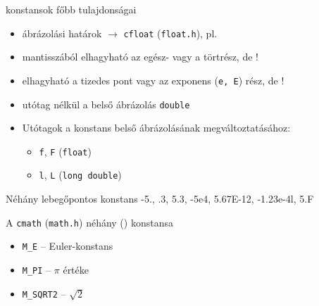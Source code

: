 \documentclass[usenames,dvipsnames,aspectratio=169]{beamer}
\begin{document}
\begin{frame}
  \begin{exampleblock}{}
  \footnotesize
  
\end{exampleblock}
\end{frame}

\begin{frame}
   konstansok főbb tulajdonságai
  \begin{itemize}
    \item ábrázolási határok $\to$ \texttt{cfloat} (\texttt{float.h}), pl. 
    \item mantisszából elhagyható az egész- vagy a törtrész, de !
    \item elhagyható a tizedes pont vagy az exponens (\texttt{e, E}) rész, de !
    \item utótag nélkül a belső ábrázolás \texttt{double}
  \end{itemize}
\end{frame}

\begin{frame}
  \begin{itemize}
    \item Utótagok a konstans belső ábrázolásának megváltoztatásához:
    \begin{itemize}
      \item \texttt{f}, \texttt{F} (\texttt{float})
      \item \texttt{l}, \texttt{L} (\texttt{long double})
    \end{itemize}
  \end{itemize}
  \begin{exampleblock}{Néhány lebegőpontos konstans}
    -5., .3, 5.3, -5e4, 5.67E-12, -1.23e-4l, 5.F
  \end{exampleblock}
   A \texttt{cmath} (\texttt{math.h}) néhány () konstansa
  \begin{itemize}
    \item \texttt{M\_E} -- Euler-konstans
    \item \texttt{M\_PI} -- $\pi$ értéke
    \item \texttt{M\_SQRT2} -- $\sqrt{2}$
  \end{itemize}
\end{frame}
\end{document}
